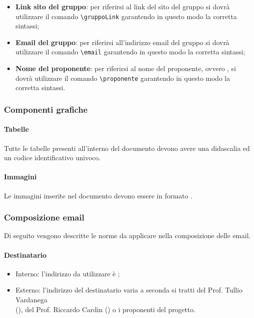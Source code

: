 \begin{itemize}
   \item \textbf{Link sito del gruppo}: per riferirsi al link del sito del gruppo si dovrà
   utilizzare il comando  \verb|\gruppoLink| garantendo in questo modo la corretta sintassi;
   \item \textbf{Email del gruppo}: per riferirsi all'indirizzo email del gruppo si dovrà
   utilizzare il comando  \verb|\email| garantendo in questo modo la corretta sintassi;
   \item \textbf{Nome del proponente}: per riferirsi al nome del proponente, ovvero \proponente, si dovrà
   utilizzare il comando   \verb|\proponente| garantendo in questo modo la corretta
   sintassi.
\end{itemize}

\subsubsection{Componenti grafiche}
\paragraph{Tabelle}
Tutte le tabelle presenti all'interno del documento devono avere una didascalia
ed un codice identificativo univoco.

\paragraph{Immagini}
Le immagini inserite nel documento devono essere in formato .

\subsubsection{Composizione email}
Di seguito vengono descritte le norme da applicare nella composizione delle email.

\paragraph{Destinatario}
\begin{itemize}
  \item Interno: l'indirizzo da utilizzare è \email;
  \item Esterno: l'indirizzo del destinatario varia a seconda si tratti del Prof. Tullio Vardanega \\ (), del Prof. Riccardo Cardin () o i proponenti del progetto.
\end{itemize}

